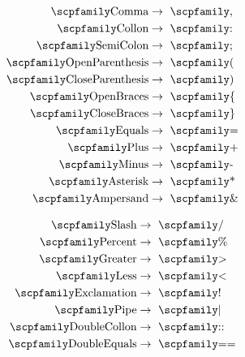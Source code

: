 \documentclass[
  oneside,
  english,
  coorientadorbanca,
  noabntexcite
]{ufsc-thesis-rn46-2019}
\newcommand{\code}[1]{\text{\scpfamily\setlength\spaceskip{0.35em}#1}}
\begin{document}
\begin{figure}[ht]
  \centering
  \begin{subfigure}[b]{0.3\textwidth}
    \small
    \begin{minipage}{\textwidth}
      \begin{align*}
        \code{Comma}            & \rightarrow \ \code{,}  \\
        \code{Collon}           & \rightarrow \ \code{:}  \\
        \code{SemiColon}        & \rightarrow \ \code{;}  \\
        \code{OpenParenthesis}  & \rightarrow \ \code{(}  \\
        \code{CloseParenthesis} & \rightarrow \ \code{)}  \\
        \code{OpenBraces}       & \rightarrow \ \code{\{} \\
        \code{CloseBraces}      & \rightarrow \ \code{\}} \\
        \code{Equals}           & \rightarrow \ \code{=}  \\
        \code{Plus}             & \rightarrow \ \code{+}  \\
        \code{Minus}            & \rightarrow \ \code{-}  \\
        \code{Asterisk}         & \rightarrow \ \code{*}  \\
        \code{Ampersand}        & \rightarrow \ \code{\&}
      \end{align*}
    \end{minipage}
  \end{subfigure}
  \begin{subfigure}[b]{0.3\textwidth}
    \begin{minipage}{\textwidth}
      \small
      \begin{align*}
        \code{Slash}             & \rightarrow \ \code{/}    \\
        \code{Percent}           & \rightarrow \ \code{\%}   \\
        \code{Greater}           & \rightarrow \ \code{>}    \\
        \code{Less}              & \rightarrow \ \code{<}    \\
        \code{Exclamation}       & \rightarrow \ \code{!}    \\
        \code{Pipe}              & \rightarrow \ \code{|}    \\
        \code{DoubleCollon}      & \rightarrow \ \code{::}   \\
        \code{DoubleEquals}      & \rightarrow \ \code{==}   \\

\end{align*}
\end{minipage}
\end{subfigure}
\end{figure}
\end{document}
